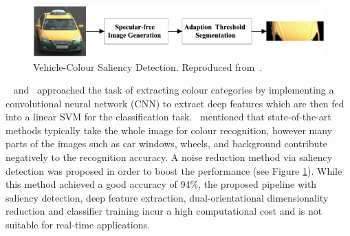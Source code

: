\begin{figure}[hbt!]
 \centering
 \includegraphics[width=1\textwidth]{image/lit/salient1.png}
 \caption[Vehicle-Colour Saliency Detection]{Vehicle-Colour Saliency Detection.
Reproduced from~.}
 \label{fig:Colorsaliency}
\end{figure}

~ and~ approached the task of extracting colour categories by implementing a convolutional neural network (CNN) to extract deep features which are then fed into a linear SVM for the classification task.~ mentioned that state-of-the-art methods typically take the whole image for colour recognition, however many parts of the images such as car windows, wheels, and background contribute negatively to the recognition accuracy. A noise reduction method via saliency detection was proposed in order to boost the performance (see Figure \ref{fig:Colorsaliency}). While this method achieved a good accuracy of 94\%, the proposed pipeline with saliency detection, deep feature extraction, dual-orientational dimensionality reduction and classifier training incur a high computational cost and is not suitable for real-time applications.

